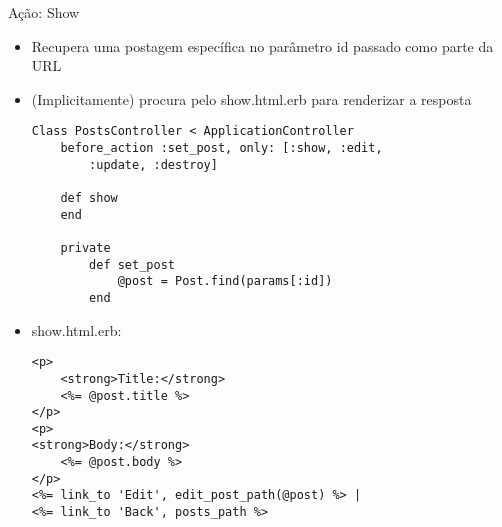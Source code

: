 \begin{frame}{Ação: Show}
	\begin{itemize}
		\item Recupera \alert{uma} postagem específica no parâmetro \alert{id} passado como parte da URL
		\item (Implicitamente) procura pelo \alert{show.html.erb} para renderizar a resposta
		\begin{lstlisting}[style=RubyInputStyle, caption=controllers/posts\_controller.rb]
Class PostsController < ApplicationController
	before_action :set_post, only: [:show, :edit, 
		:update, :destroy]
	
	def show 
	end 
	
	private
		def set_post 
			@post = Post.find(params[:id])
		end 
		\end{lstlisting}		
		\framebreak
		\item \alert{show.html.erb}:
		\begin{lstlisting}[style=RubyInputStyle, caption=views/posts/show.html.erb]
<p>
	<strong>Title:</strong>
	<%= @post.title %>
</p>
<p>
<strong>Body:</strong>
	<%= @post.body %>
</p>
<%= link_to 'Edit', edit_post_path(@post) %> |
<%= link_to 'Back', posts_path %>	
		\end{lstlisting}		
	\end{itemize}	
\end{frame}